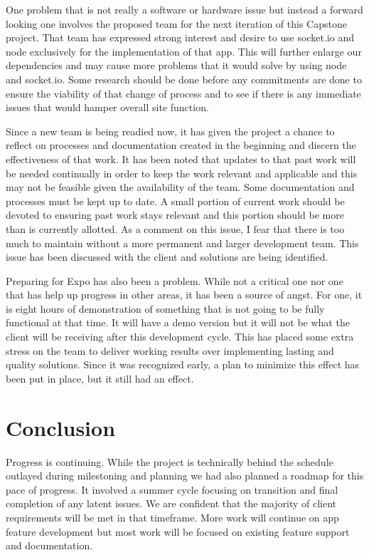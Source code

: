 \documentclass[onecolumn, draftclsnofoot,10pt, compsoc]{IEEEtran}
\begin{document}
One problem that is not really a software or hardware issue but instead a forward looking one involves the proposed team for the next iteration of this Capstone project. That team has expressed strong interest and desire to use socket.io and node exclusively for the implementation of that app. This will further enlarge our dependencies and may cause more problems that it would solve by using node and socket.io. Some research should be done before any commitments are done to ensure the viability of that change of process and to see if there is any immediate issues that would hamper overall site function. 

Since a new team is being readied now, it has given the project a chance to reflect on processes and documentation created in the beginning and discern the effectiveness of that work. It has been noted that updates to that past work will be needed continually in order to keep the work relevant and applicable and this may not be feasible given the availability of the team. Some documentation and processes must be kept up to date. A small portion of current work should be devoted to ensuring past work stays relevant and this portion should be more than is currently allotted. As a comment on this issue, I fear that there is too much to maintain without a more permanent and larger development team. This issue has been discussed with the client and solutions are being identified. 

Preparing for Expo has also been a problem. While not a critical one nor one that has help up progress in other areas, it has been a source of angst. For one, it is eight hours of demonstration of something that is not going to be fully functional at that time. It will have a demo version but it will not be what the client will be receiving after this development cycle. This has placed some extra stress on the team to deliver working results over implementing lasting and quality solutions. Since it was recognized early, a plan to minimize this effect has been put in place, but it still had an effect. 

 \section{Conclusion}
 Progress is continuing. While the project is technically behind the schedule outlayed during milestoning and planning we had also planned a roadmap for this pace of progress. It involved a summer cycle focusing on transition and final completion of any latent issues. We are confident that the majority of client requirements will be met in that timeframe. More work will continue on app feature development but most work will be focused on existing feature support and documentation.
 
 
\end{document}
